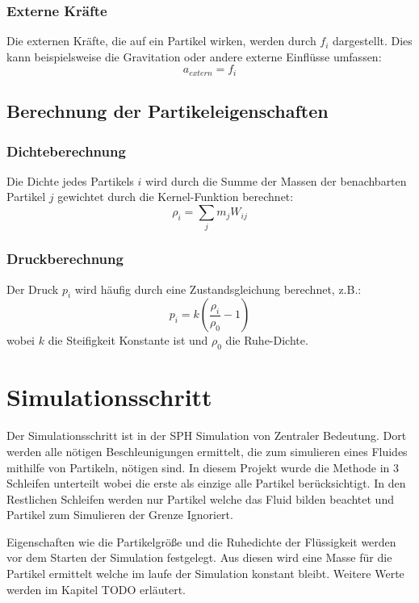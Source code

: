 \documentclass[a4paper, 12pt]{article}
\begin{document}
\subsubsection{Externe Kräfte}
Die externen Kräfte, die auf ein Partikel wirken, werden durch \( f_i \) dargestellt. Dies kann beispielsweise die Gravitation oder andere externe Einflüsse umfassen:
\begin{equation}
	a_{extern} = f_i
\end{equation}
\subsection{Berechnung der Partikeleigenschaften}
\subsubsection{Dichteberechnung}
Die Dichte jedes Partikels \(i\) wird durch die Summe der Massen der benachbarten Partikel \(j\) gewichtet durch die Kernel-Funktion berechnet:
\begin{equation} \label{equ:localDichte}
	\rho_i = \sum_j m_j W_{ij}
\end{equation}

\subsubsection{Druckberechnung}
Der Druck \(p_i\) wird häufig durch eine Zustandsgleichung berechnet, z.B.:
\begin{equation} \label{equ:lokalDruck}
	p_i = k (\frac{\rho_i}{\rho_0} - 1)
\end{equation}
wobei \(k\) die Steifigkeit Konstante ist und \(\rho_0\) die Ruhe-Dichte.

\section{Simulationsschritt} \label{section_3}
Der Simulationsschritt ist in der SPH Simulation von Zentraler Bedeutung. Dort werden alle nötigen Beschleunigungen ermittelt, die zum simulieren eines Fluides mithilfe von Partikeln, nötigen sind. In diesem Projekt wurde die Methode in 3 Schleifen unterteilt wobei die erste als einzige alle Partikel berücksichtigt. In den Restlichen Schleifen werden nur Partikel welche das Fluid bilden beachtet und Partikel zum Simulieren der Grenze Ignoriert.

Eigenschaften wie die Partikelgröße und die Ruhedichte der Flüssigkeit werden vor dem Starten der Simulation festgelegt. Aus diesen wird eine Masse für die Partikel ermittelt welche im laufe der Simulation konstant bleibt. Weitere Werte werden im Kapitel TODO erläutert. 
\end{document}
